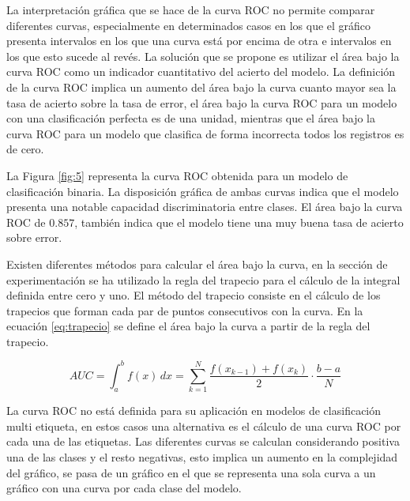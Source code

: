 La interpretación gráfica que se hace de la curva ROC no permite comparar diferentes curvas, especialmente en determinados casos en los que el gráfico presenta intervalos en los que una curva está por encima de otra e intervalos en los que esto sucede al revés. La solución que se propone es utilizar el área bajo la curva ROC como un indicador cuantitativo del acierto del modelo. La definición de la curva ROC implica un aumento del área bajo la curva cuanto mayor sea la tasa de acierto sobre la tasa de error, el área bajo la curva ROC para un modelo con una clasificación perfecta es de una unidad, mientras que el área bajo la curva ROC para un modelo que clasifica de forma incorrecta todos los registros es de cero.

\bigbreak

La Figura \ref{fig:5} representa la curva ROC obtenida para un modelo de clasificación binaria. La disposición gráfica de ambas curvas indica que el modelo presenta una notable capacidad discriminatoria entre clases. El área bajo la curva ROC de $0.857$, también indica que el modelo tiene una muy buena tasa de acierto sobre error.

\bigbreak

Existen diferentes métodos para calcular el área bajo la curva, en la sección de experimentación se ha utilizado la regla del trapecio para el cálculo de la integral definida entre cero y uno. El método del trapecio consiste en el cálculo de los trapecios que forman cada par de puntos consecutivos con la curva. En la ecuación \ref{eq:trapecio} se define el área bajo la curva a partir de la regla del trapecio.

\bigbreak

\begin{equation}
    AUC = \int_{a}^{b} f(x) \,dx = \sum_{k=1}^{N} \frac{f(x_{k-1})+f(x_{k})}{2} \cdot \frac{b-a}{N}
    \label{eq:trapecio}
\end{equation}

\bigbreak

La curva ROC no está definida para su aplicación en modelos de clasificación multi etiqueta, en estos casos una alternativa es el cálculo de una curva ROC por cada una de las etiquetas. Las diferentes curvas se calculan considerando positiva una de las clases y el resto negativas, esto implica un aumento en la complejidad del gráfico, se pasa de un gráfico en el que se representa una sola curva a un gráfico con una curva por cada clase del modelo.

\clearpage

